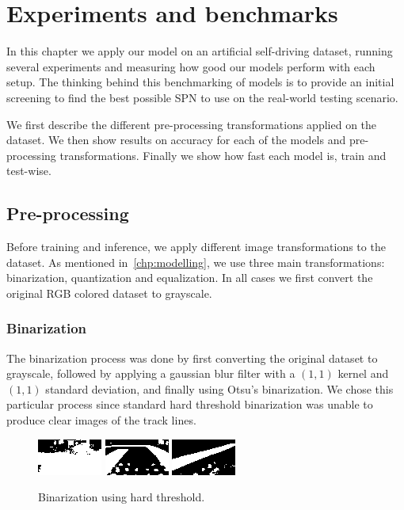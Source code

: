 
\chapter{Experiments and benchmarks}\label{chp:benchmarks}

In this chapter we apply our model on an artificial self-driving dataset, running several
experiments and measuring how good our models perform with each setup. The thinking behind this
benchmarking of models is to provide an initial screening to find the best possible SPN to use on
the real-world testing scenario.

We first describe the different pre-processing transformations applied on the dataset. We then show
results on accuracy for each of the models and pre-processing transformations. Finally we show how
fast each model is, train and test-wise.

\section{Pre-processing}

Before training and inference, we apply different image transformations to the dataset. As
mentioned in~\autoref{chp:modelling}, we use three main transformations: binarization, quantization
and equalization. In all cases we first convert the original RGB colored dataset to grayscale.

\subsection{Binarization}

The binarization process was done by first converting the original dataset to grayscale, followed
by applying a gaussian blur filter with a $(1, 1)$ kernel and $(1, 1)$ standard deviation, and
finally using Otsu's binarization. We chose this particular process since standard hard threshold
binarization was unable to produce clear images of the track lines.

\begin{figure}[h]
  \centering
  \includegraphics[scale=1.75]{imgs/binary_left_h.png}
  \includegraphics[scale=1.75]{imgs/binary_up_h.png}
  \includegraphics[scale=1.75]{imgs/binary_right_h.png}
  \caption{Binarization using hard threshold.\label{fig:bin-hard}}
\end{figure}

